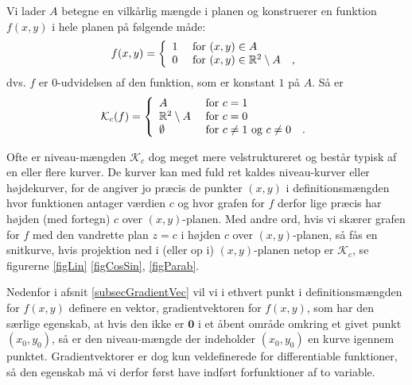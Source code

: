 \begin{example}[Niveaumængder]
Vi lader $A$ betegne en vilkårlig mængde i planen og  konstruerer en funktion $f(x,y)$ i hele planen på følgende måde:
\begin{equation}
f(x,y) = \left\{
           \begin{array}{ll}
             1 & \hbox{\,\,for $(x,y) \in A$} \\
             0 & \hbox{\,\,for $(x,y) \in \mathbb{R}^{2} \setminus A$\quad ,}
           \end{array}
         \right.
\end{equation}
dvs. $f$ er $0$-udvidelsen af den funktion, som er konstant $1$ på $A$. Så er
\begin{equation}
\mathcal{K}_{c}(f) = \left\{
  \begin{array}{ll}
    A & \hbox{\,\,for $c = 1$} \\
    \mathbb{R}^{2} \setminus A & \hbox{\,\,for $c = 0$} \\
    \emptyset  & \hbox{\,\,for $c \neq 1$ og $c \neq 0$\quad .}
  \end{array}
\right.
\end{equation}
\end{example}

Ofte er niveau-mængden $\mathcal{K}_{c}$ dog meget mere velstruktureret og består typisk af en eller flere kurver.
De kurver kan med fuld ret kaldes niveau-kurver eller højdekurver, for de angiver jo præcis de punkter $(x,y)$ i definitionsmængden hvor funktionen antager værdien $c$ og hvor grafen for $f$ derfor lige præcis har højden (med fortegn) $c$ over $(x,y)$-planen. Med andre ord, hvis vi skærer
grafen for $f$ med den vandrette plan $z = c$ i højden $c$ over $(x,y)$-planen, så fås en snitkurve, hvis projektion ned i (eller op i)
$(x,y)$-planen netop er $\mathcal{K}_{c}$, se figurerne \ref{figLin} \ref{figCosSin}, \ref{figParab}.




\begin{think}
Nedenfor i afsnit \ref{subsecGradientVec}  vil vi i ethvert punkt i definitionsmængden for $f(x,y)$ definere en vektor, gradientvektoren for $f(x,y)$, som har den særlige egenskab, at hvis den ikke er $\mathbf{0}$ i et åbent område omkring et givet punkt $(x_{0}, y_{0})$,  så er den niveau-mængde der indeholder $(x_{0}, y_{0})$ en kurve igennem punktet. Gradientvektorer er dog kun veldefinerede for differentiable funktioner, så den egenskab må vi derfor først have indført forfunktioner af to variable.
\end{think}

